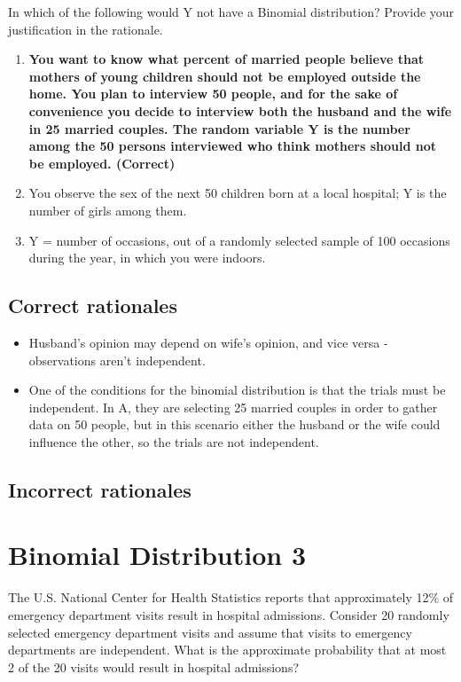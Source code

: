\documentclass[letterpaper,9pt,twoside,printwatermark=false]{pinp}
\providecommand{\tightlist}{%
  \setlength{\itemsep}{0pt}\setlength{\parskip}{0pt}}
\begin{document}
In which of the following would Y not have a Binomial distribution?
Provide your justification in the rationale.

\begin{enumerate}
\def\labelenumi{\alph{enumi}.}
\tightlist
\item
  \textbf{You want to know what percent of married people believe that
  mothers of young children should not be employed outside the home. You
  plan to interview 50 people, and for the sake of convenience you
  decide to interview both the husband and the wife in 25 married
  couples. The random variable Y is the number among the 50 persons
  interviewed who think mothers should not be employed. (Correct)}
\item
  You observe the sex of the next 50 children born at a local hospital;
  Y is the number of girls among them.
\item
  Y = number of occasions, out of a randomly selected sample of 100
  occasions during the year, in which you were indoors.
\end{enumerate}

\subsection{Correct rationales}\label{correct-rationales-1}

\begin{itemize}
\tightlist
\item
  Husband's opinion may depend on wife's opinion, and vice versa -
  observations aren't independent.
\item
  One of the conditions for the binomial distribution is that the trials
  must be independent. In A, they are selecting 25 married couples in
  order to gather data on 50 people, but in this scenario either the
  husband or the wife could influence the other, so the trials are not
  independent.
\end{itemize}

\subsection{Incorrect rationales}\label{incorrect-rationales-1}

\section{Binomial Distribution 3}\label{binomial-distribution-3}

The U.S. National Center for Health Statistics reports that
approximately 12\% of emergency department visits result in hospital
admissions. Consider 20 randomly selected emergency department visits
and assume that visits to emergency departments are independent. What is
the approximate probability that at most 2 of the 20 visits would result
in hospital admissions?
\end{document}
